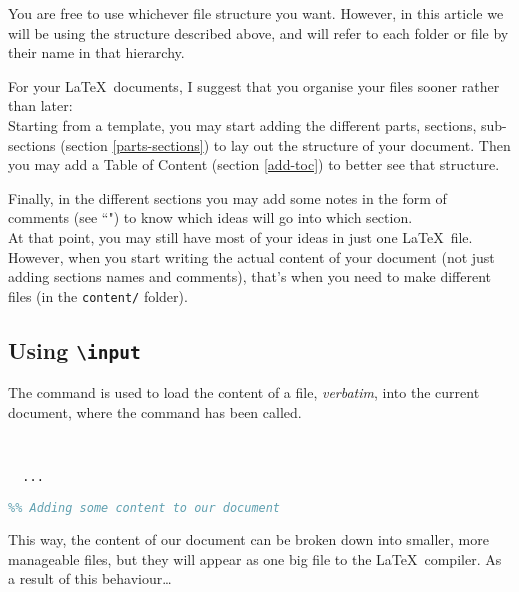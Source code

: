 \begin{note}
You are free to use whichever file structure you want. However, in this article we will be using the structure described above, and will refer to each folder or file by their name in that hierarchy.
\end{note}


\bigskip


For your \LaTeX\ documents, I suggest that you organise your files sooner rather than later: \\

Starting from a template, you may start adding the different parts, sections, sub-sections 
(section \ref{parts-sections}) to lay out the structure of your document. 
Then you may add a Table of Content (section \ref{add-toc}) to better see that structure.

Finally, in the different sections you may add some notes in the form of comments (see ``") to know which ideas will go into which section. \\

At that point, you may still have most of your ideas in just one \LaTeX\ file. \\

However, when you start writing the actual content of your document (not just adding sections names and comments), that's when you need to make different files (in the \texttt{content/} folder).


\newpage

\subsection{Using \texttt{\textbackslash input}}

The  command is used to load the content of a file, \emph{verbatim}, into the current document, where the  command has been called.

\begin{lstlisting}[language=tex]
%% Importing our custom macros


  ...

%% Adding some content to our document

\end{lstlisting}

\bigskip

This way, the content of our document can be broken down into smaller, more manageable files, but they will appear as one big file to the \LaTeX\ compiler. As a result of this behaviour\dots

